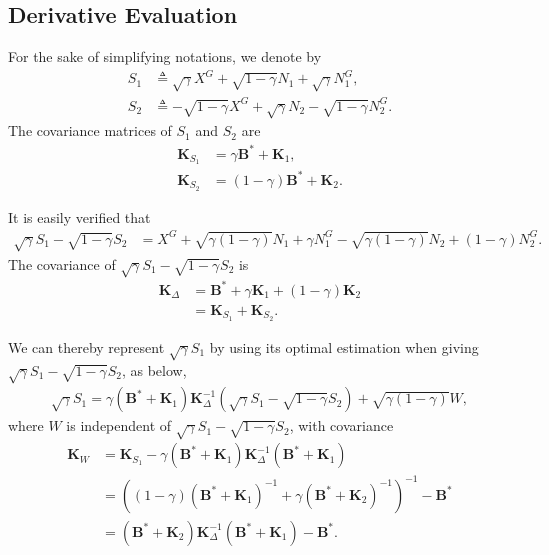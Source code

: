 \documentclass[journal,final, onecolumn]{IEEEtran}
\begin{document}
\subsection{Derivative Evaluation}

For the sake of simplifying notations, we denote by
\begin{align}
S_{1} &\triangleq \sqrt{\gamma}X^{G}+\sqrt{1-\gamma}N_{1} + \sqrt{\gamma} N^{G}_{1}, \label{eq:S1}\\
S_{2} &\triangleq -\sqrt{1-\gamma}X^{G}+ \sqrt{\gamma}N_{2}- \sqrt{1-\gamma}N^{G}_{2}. \label{eq:S2}
\end{align}
The covariance matrices of $S_{1}$ and $S_{2}$ are
\begin{align}
\boldsymbol{K}_{S_1} &= \gamma \boldsymbol{B}^{*} + \boldsymbol{K}_{1},\\
\boldsymbol{K}_{S_{2}} &= (1-\gamma) \boldsymbol{B}^{*} + \boldsymbol{K}_{2}.
\end{align}

It is easily verified that
\begin{align}
\sqrt{\gamma}S_{1} - \sqrt{1-\gamma}S_{2} &= X^{G} + \sqrt{\gamma(1-\gamma)} {N}_{1} + {\gamma}N^{G}_{1} - \sqrt{\gamma(1-\gamma)} {N}_{2}+ (1-\gamma)N^{G}_{2}.
\end{align}
The covariance of $\sqrt{\gamma}S_{1} - \sqrt{1-\gamma}S_{2}$ is
\begin{align}
\boldsymbol{K}_{\Delta} &=\boldsymbol{B}^{*} + \gamma \boldsymbol{K}_{1} + (1-\gamma) \boldsymbol{K}_{2} \label{eqn:KW}\\
&=\boldsymbol{K}_{S_1} + \boldsymbol{K}_{S_2}.
\end{align}

We can thereby represent $\sqrt{\gamma}S_1$ by using its optimal estimation when giving $\sqrt{\gamma}S_{1} - \sqrt{1-\gamma}S_{2}$, as below,
\begin{align}
\sqrt{\gamma} S_1 = \gamma (\boldsymbol{B}^{*} + \boldsymbol{K}_{1}) \boldsymbol{K}_{\Delta}^{-1}\left(    \sqrt{\gamma}S_{1} - \sqrt{1-\gamma}S_{2}  \right) + \sqrt{\gamma (1-\gamma)} W ,\label{eq:W}
\end{align}
where $W$ is independent of $\sqrt{\gamma}S_{1} - \sqrt{1-\gamma}S_{2}$, with covariance
\begin{align}
\boldsymbol{K}_{W} &=\boldsymbol{K}_{S_1} - \gamma \left( \boldsymbol{B}^{*} +\boldsymbol{K}_{1}\right)\boldsymbol{K}_{\Delta}^{-1}\left( \boldsymbol{B}^{*} +\boldsymbol{K}_{1}\right) \\
  &=\left(   {(1-\gamma)}(\boldsymbol{B}^{*} + \boldsymbol{K}_{1})^{-1} +  \gamma (\boldsymbol{B}^{*} + \boldsymbol{K}_{2})^{-1}           \right)^{-1} - \boldsymbol{B}^{*}\\
  &=(\boldsymbol{B}^{*} + \boldsymbol{K}_{2}) \boldsymbol{K}^{-1}_{\Delta}(\boldsymbol{B}^{*} + \boldsymbol{K}_{1}) - \boldsymbol{B}^{*}. \label{eq:KW3}
\end{align}
\end{document}
